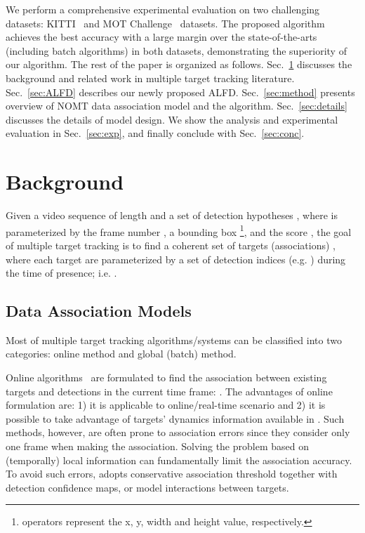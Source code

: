 \documentclass[10pt,twocolumn,letterpaper]{article}
\begin{document}
We perform a comprehensive experimental evaluation on two challenging datasets: KITTI~\cite{Geiger2012CVPR} and MOT Challenge~\cite{MOTChallenge} datasets. The proposed algorithm achieves the best accuracy with a large margin over the state-of-the-arts (including batch algorithms) in both datasets, demonstrating the superiority of our algorithm. The rest of the paper is organized as follows. Sec.~\ref{sec:background} discusses the background and related work in multiple target tracking literature. Sec.~\ref{sec:ALFD} describes our newly proposed ALFD. Sec.~\ref{sec:method} presents overview of NOMT data association model and the algorithm. Sec.~\ref{sec:details} discusses the details of model design. We show the analysis and experimental evaluation in Sec.~\ref{sec:exp}, and finally conclude with Sec.~\ref{sec:conc}.


\section{Background}
\label{sec:background}

Given a video sequence  of length  and a set of detection hypotheses , where  is parameterized by the frame number , a bounding box \footnote{ operators represent the x, y, width and height value, respectively.}, and the score , 
the goal of multiple target tracking is to find a coherent set of targets (associations) , where each target  are parameterized by a set of detection indices (e.g. )  during the time of presence; i.e. . 

\subsection{Data Association Models}

Most of multiple target tracking algorithms/systems can be classified into two categories: online method and global (batch) method. 

Online algorithms~\cite{BreitensteinICCV09,choi_pami13,Ess_PAMI_09,Khan_PAMI_05,pellegrini2009you} are formulated to find the association between existing targets and detections in the current time frame: . The advantages of online formulation are: 1) it is applicable to online/real-time scenario and 2) it is possible to take advantage of targets' dynamics information available in . Such methods, however, are often prone to association errors since they consider only one frame when making the association. 
Solving the problem based on (temporally) local information can fundamentally limit the association accuracy. 
To avoid such errors, \cite{BreitensteinICCV09} adopts conservative association threshold together with detection confidence maps, or \cite{choi_pami13,Khan_PAMI_05,pellegrini2009you} model interactions between targets. 
\end{document}
